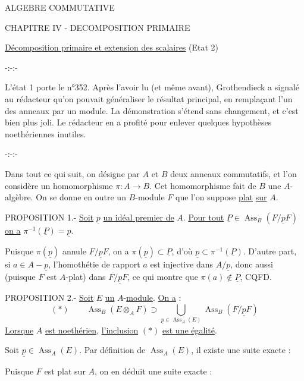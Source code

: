 
\begin{center}
ALGEBRE COMMUTATIVE

CHAPITRE IV - DECOMPOSITION PRIMAIRE

\uline{Décomposition primaire et extension des scalaires} (Etat 2)

-:-:-
\end{center}

L'état 1 porte le n°352. Après l'avoir lu (et même avant), Grothendieck
a signalé au rédacteur qu'on pouvait généraliser le résultat principal, en
remplaçant l'un des anneaux par un module. La démonstration s'étend sans
changement, et c'est bien plus joli. Le rédacteur en a profité pour enlever
quelques hypothèses noethériennes inutiles.

\begin{center}-:-:-\end{center}

Dans tout ce qui suit, on désigne par $A$ et $B$ deux anneaux commutatifs,
et l'on considère un homomorphisme $\pi:A\longrightarrow B$. Cet homomorphisme fait de
$B$ une $A$-algèbre. On se donne en outre un $B$-module $F$ que l'on suppose \uline{plat}
\uline{sur} $A$.

PROPOSITION 1.- \uline{Soit} $\underline p$ \uline{un idéal premier de} $A$. \uline{Pour tout} $\underline P\in\operatorname{Ass}_B(F/\underline pF)$ \uline{on a}
$\pi^{-1}(\underline P)=\underline p$.

Puisque $\pi(\underline p)$ annule $F/\underline pF$, on a $\pi(\underline p)\subset\underline P$, d'où $\underline p\subset\pi^{-1}(\underline P)$. D'autre
part, si $a\in A-\underline p$, l'homothétie de rapport $a$ est injective dans $A/\underline p$, donc
aussi (puisque $F$ est $A$-plat) dans $F/\underline pF$, ce qui montre que $\pi(a)\notin\underline P$, CQFD.

PROPOSITION 2.- \uline{Soit} $E$ \uline{un} $A$-\uline{module}. \uline{On a} :
\[
(\ast)\qquad
\operatorname{Ass}_B(E\otimes_A F)\supset\bigcup_{\underline p\in\operatorname{Ass}_A(E)}\operatorname{Ass}_B(F/\underline pF)
\]
\uline{Lorsque} $A$ \uline{est noethérien}, \uline{l'inclusion} $(\ast)$ \uline{est une égalité}.

Soit $\underline p\in\operatorname{Ass}_A(E)$. Par définition de $\operatorname{Ass}_A(E)$, il existe une suite exacte :

Puisque $F$ est plat sur $A$, on en déduit une suite exacte :

